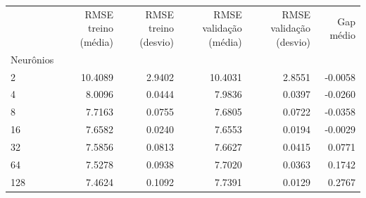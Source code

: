 \begin{tabular}{lrrrrr}
\toprule
 & RMSE treino (média) & RMSE treino (desvio) & RMSE validação (média) & RMSE validação (desvio) & Gap médio \\
Neurônios &  &  &  &  &  \\
\midrule
2 & 10.4089 & 2.9402 & 10.4031 & 2.8551 & -0.0058 \\
4 & 8.0096 & 0.0444 & 7.9836 & 0.0397 & -0.0260 \\
8 & 7.7163 & 0.0755 & 7.6805 & 0.0722 & -0.0358 \\
16 & 7.6582 & 0.0240 & 7.6553 & 0.0194 & -0.0029 \\
32 & 7.5856 & 0.0813 & 7.6627 & 0.0415 & 0.0771 \\
64 & 7.5278 & 0.0938 & 7.7020 & 0.0363 & 0.1742 \\
128 & 7.4624 & 0.1092 & 7.7391 & 0.0129 & 0.2767 \\
\bottomrule
\end{tabular}
